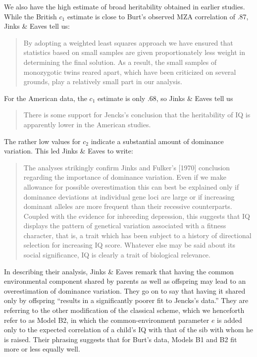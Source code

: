 ﻿\documentclass[12pt]{article}
\begin{document}
We also have the high estimate of broad heritability obtained in earlier studies. While the British $c_1$ estimate is close to Burt's observed MZA correlation of .87, Jinks \& Eaves tell us:

\begin{quote}
By adopting a weighted least squares approach we have ensured that statistics based on small samples are given proportionately less weight in determining the final solution. As a result, the small samples of monozygotic twins reared apart, which have been criticized on several grounds, play a relatively small part in our analysis.
\end{quote}

For the American data, the $c_1$ estimate is only .68, so Jinks \& Eaves tell us

\begin{quote}
There is some support for Jencks's conclusion that the heritability of IQ is apparently lower in the American studies.
\end{quote}

The rather low values for $c_2$ indicate a substantial amount of dominance variation. This led Jinks \& Eaves to write:

\begin{quote}
The analyses strikingly confirm Jinks and Fulker's [1970] conclusion regarding the importance of dominance variation. Even if we make allowance for possible overestimation this can best be explained only if dominance deviations at individual gene loci are large or if increasing dominant alleles are more frequent than their recessive counterparts. Coupled with the evidence for inbreeding depression, this suggests that IQ displays the pattern of genetical variation associated with a fitness character, that is, a trait which has been subject to a history of directional selection for increasing IQ score. Whatever else may be said about its social significance, IQ is clearly a trait of biological relevance.
\end{quote}

In describing their analysis, Jinks \& Eaves remark that having the common environmental component shared by parents as well as offspring may lead to an overestimation of dominance variation. They go on to say that having it shared only by offspring ``results in a significantly poorer fit to Jencks's data.'' They are referring to the other modification of the classical scheme, which we henceforth refer to as Model B2, in which the common-environment parameter $e$ is added only to the expected correlation of a child's IQ with that of the sib with whom he is raised. Their phrasing suggests that for Burt's data, Models B1 and B2 fit more or less equally well.
\end{document}
